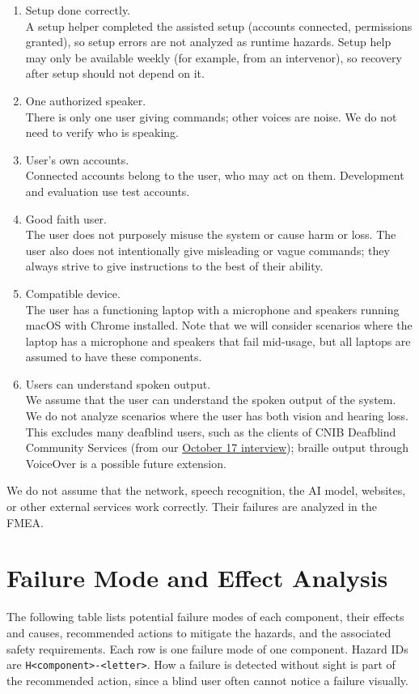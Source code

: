\documentclass{article}
\begin{document}
\begin{enumerate}
  \item Setup done correctly. 
    \\A setup helper completed the assisted setup (accounts connected, permissions granted), so setup errors are not analyzed as runtime hazards. Setup help may only be available weekly (for example, from an intervenor), so recovery after setup should not depend on it.
  \item One authorized speaker. 
    \\There is only one user giving commands; other voices are noise. We do not need to verify who is speaking.
  \item User's own accounts. 
    \\Connected accounts belong to the user, who may act on them. Development and evaluation use test accounts.
  \item Good faith user. 
    \\The user does not purposely misuse the system or cause harm or loss. The user also does not intentionally give misleading or vague commands; they always strive to give instructions to the best of their ability.
  \item Compatible device. 
    \\The user has a functioning laptop with a microphone and speakers running macOS with Chrome installed. Note that we will consider scenarios where the laptop has a microphone and speakers that fail mid-usage, but all laptops are assumed to have these components.
  \item Users can understand spoken output. 
    \\We assume that the user can understand the spoken output of the system. We do not analyze scenarios where the user has both vision and hearing loss. This excludes many deafblind users, such as the clients of CNIB Deafblind Community Services (from our \href{https://github.com/NaturalControl/natural-control/blob/main/refs/interviews/2026-10-17-dbcs-transcript.md}{October 17 interview}); braille output through VoiceOver is a possible future extension.
\end{enumerate}
We do not assume that the network, speech recognition, the AI model, websites, or other external services work correctly. Their failures are analyzed in the FMEA.

\section{Failure Mode and Effect Analysis}
\label{sec:FMEA}
The following table lists potential failure modes of each component, their effects and causes, recommended actions to mitigate the hazards, and the associated safety requirements.
Each row is one failure mode of one component. Hazard IDs are \texttt{H<component>-<letter>}. How a failure is detected without sight is part of the recommended action, since a blind user often cannot notice a failure visually.
\end{document}
